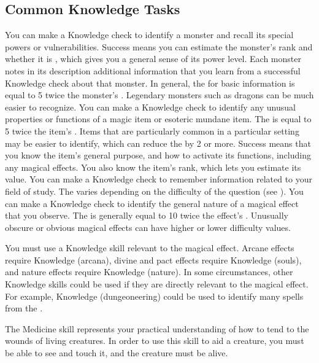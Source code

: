  \subsection{Common Knowledge Tasks}
     You can make a Knowledge check to identify a monster and recall its special powers or vulnerabilities.
    Success means you can estimate the monster's rank and whether it is , which gives you a general sense of its power level.
    Each monster notes in its description additional information that you learn from a successful Knowledge check about that monster.
    In general, the  for basic information is equal to 5 \add twice the monster's .
    Legendary monsters such as dragons can be much easier to recognize.
     You can make a Knowledge check to identify any unusual properties or functions of a magic item or esoteric mundane item.
    The  is equal to 5 \add twice the item's .
    Items that are particularly common in a particular setting may be easier to identify, which can reduce the  by 2 or more.
    Success means that you know the item's general purpose, and how to activate its functions, including any magical effects.
    You also know the item's rank, which lets you estimate its value.
     You can make a Knowledge check to remember information related to your field of study.
    The  varies depending on the difficulty of the question (see ).
     You can make a Knowledge check to identify the general nature of a magical effect that you observe.
    The  is generally equal to 10 \add twice the effect's .
    Unusually obscure or obvious magical effects can have higher or lower difficulty values.

    You must use a Knowledge skill relevant to the magical effect.
    Arcane effects require Knowledge (arcana), divine and pact effects require Knowledge (souls), and nature effects require Knowledge (nature).
    In some circumstances, other Knowledge skills could be used if they are directly relevant to the magical effect.
    For example, Knowledge (dungeoneering) could be used to identify many spells from the  .

\newpage
{}
  The Medicine skill represents your practical understanding of how to tend to the wounds of living creatures.
  In order to use this skill to aid a creature, you must be able to see and touch it, and the creature must be alive.


